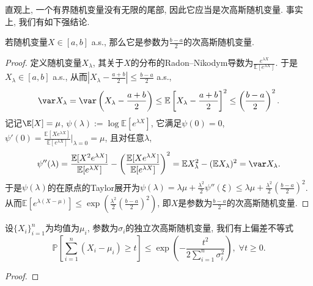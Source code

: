 直观上, 一个有界随机变量没有无限的尾部, 因此它应当是次高斯随机变量. 
事实上, 我们有如下强结论. 
\begin{lemma}[有界随机变量的次高斯参数]\label{lemma:SubGaussianParameterOfBddRV}
	若随机变量$X \in [a, b]$ a.s., 那么它是参数为$\frac{b-a}{2}$的次高斯随机变量. 
\end{lemma}
\begin{proof}
	定义随机变量$X_{\lambda}$, 其关于$X$的分布的Radon–Nikodym导数为$\frac{e^{\lambda X}}{\mathbb{E}[e^{\lambda X}]}$. 
	于是$X_{\lambda} \in [a, b]$ a.s., 从而$\left|X_{\lambda} - \frac{a+b}{2} \right| \leq \frac{b-a}{2}$ a.s., 
	\begin{equation*}
		\var X_{\lambda}
		= \var \left(X_{\lambda} - \frac{a+b}{2} \right) 
		\leq \mathbb{E}\left[X_{\lambda} - \frac{a+b}{2} \right]^2 
		\leq \left(\frac{b-a}{2}\right)^2. 
	\end{equation*}
	记记$\E[X] = \mu$, $\psi(\lambda) := \log \mathbb{E}[e^{\lambda X}]$, 它满足$\psi(0) = 0$, $\psi'(0) = \frac{\mathbb{E}[X e^{\lambda X}]}{\mathbb{E}[e^{\lambda X}]} \big|_{\lambda = 0} = \mu$, 且对任意$\lambda$,  
	\begin{equation*}
		\psi''(\lambda) 
		= \frac{\mathbb{E}[X^2 e^{\lambda X}]}{\mathbb{E}[e^{\lambda X}]} - \left( \frac{\mathbb{E}[X e^{\lambda X}]}{\mathbb{E}[e^{\lambda X}]} \right)^2
		= \mathbb{E}X_{\lambda}^2 - (\mathbb{E}X_{\lambda})^2
		= \var X_{\lambda}.  
	\end{equation*}
	于是$\psi(\lambda)$的在原点的Taylor展开为$\psi(\lambda) = \lambda \mu + \frac{\lambda^2}{2} \psi''(\xi) \leq \lambda \mu + \frac{\lambda^2}{2} \left(\frac{b-a}{2}\right)^2$. 
	从而$\mathbb{E}[e^{\lambda(X - \mu)}] \leq \exp\left(\frac{\lambda^2}{2} \left(\frac{b-a}{2}\right)^2\right)$, 即$X$是参数为$\frac{b-a}{2}$的次高斯随机变量. 
\end{proof}


\begin{proposition}[Hoeffding界]
	设$\{X_i\}_{i=1}^n$为均值为$\mu_i$, 参数为$\sigma_i$的独立次高斯随机变量, 我们有上偏差不等式
	\begin{equation}
		\mathbb{P} \left[ \sum_{i=1}^n (X_i - \mu_i) \geq t \right]
		\leq \exp \left( - \frac{t^2}{2 \sum_{i=1}^n \sigma_i^2} \right ),\; 
		\forall t \geq 0.
	\end{equation}
\end{proposition}
\begin{proof}
	
\end{proof}


